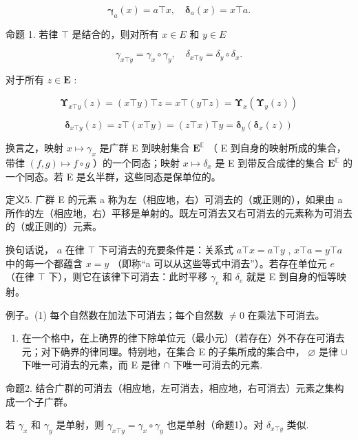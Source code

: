 \[
\boldsymbol {\gamma} _ {a} (x) = a \top x, \quad \boldsymbol {\delta} _ {a} (x) = x \top a.
\]

命题 1. 若律 \(\top\) 是结合的，则对所有 \(x \in E\) 和 \(y \in E\)

\[
\gamma_ {x \top y} = \gamma_ {x} \circ \gamma_ {y}, \quad \delta_ {x \top y} = \delta_ {y} \circ \delta_ {x}.
\]

对于所有 \(z \in \mathbf{E}\) :

\[
\boldsymbol {\Upsilon} _ {x \top y} (z) = (x \top y) \top z = x \top (y \top z) = \boldsymbol {\Upsilon} _ {x} (\boldsymbol {\Upsilon} _ {y} (z))
\]

\[
\boldsymbol {\delta} _ {x \top y} (z) = z \top (x \top y) = (z \top x) \top y = \boldsymbol {\delta} _ {y} (\boldsymbol {\delta} _ {x} (z))
\]

换言之，映射 \(x \mapsto \gamma_x\) 是广群 E 到映射集合 \(\mathbf{E}^{\mathbb{E}}\) （ E 到自身的映射所成的集合，带律 \((f, g) \mapsto f \circ g\) ）的一个同态；映射 \(x \mapsto \delta_x\) 是 E 到带反合成律的集合 \(\mathbf{E}^{\mathbb{E}}\) 的一个同态。若 E 是幺半群，这些同态是保单位的。

定义5. 广群 E 的元素 a 称为左（相应地，右）可消去的（或正则的），如果由 a 所作的左（相应地，右）平移是单射的。既左可消去又右可消去的元素称为可消去的（或正则的）元素。

换句话说， \(a\) 在律 \(\top\) 下可消去的充要条件是：关系式 \(a \top x = a \top y\) , \(x \top a = y \top a\) 中的每一个都蕴含 \(x = y\) （即称“a 可以从这些等式中消去”）。若存在单位元 \(e\) （在律 \(\top\) 下），则它在该律下可消去：此时平移 \(\gamma_e\) 和 \(\delta_e\) 就是 E 到自身的恒等映射。

例子。(1) 每个自然数在加法下可消去；每个自然数 \(\neq 0\) 在乘法下可消去。

\begin{enumerate}
\def\labelenumi{(\arabic{enumi})}
\setcounter{enumi}{1}
\tightlist
\item
  在一个格中，在上确界的律下除单位元（最小元）（若存在）外不存在可消去元；对下确界的律同理。特别地，在集合 E 的子集所成的集合中， \(\varnothing\) 是律 \(\cup\) 下唯一可消去的元素，而 E 是律 \(\cap\) 下唯一可消去的元素.
\end{enumerate}

命题2. 结合广群的可消去（相应地，左可消去，相应地，右可消去）元素之集构成一个子广群。

若 \(\gamma_{x}\) 和 \(\gamma_{y}\) 是单射，则 \(\gamma_{x\top y} = \gamma_{x}\circ \gamma_{y}\) 也是单射（命题1）。对 \(\delta_{x\top y}\) 类似.

